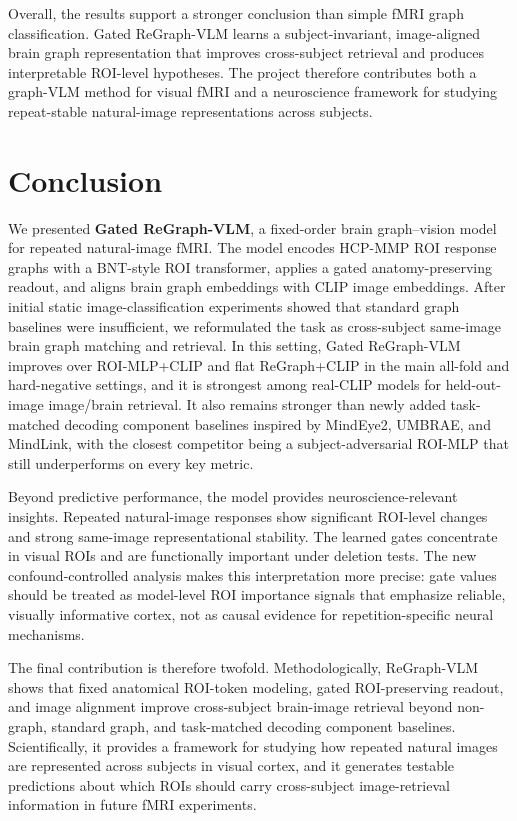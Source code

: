 \documentclass{article}
\begin{document}
Overall, the results support a stronger conclusion than simple fMRI graph classification. Gated ReGraph-VLM learns a subject-invariant, image-aligned brain graph representation that improves cross-subject retrieval and produces interpretable ROI-level hypotheses. The project therefore contributes both a graph-VLM method for visual fMRI and a neuroscience framework for studying repeat-stable natural-image representations across subjects.

\section{Conclusion}
\label{sec:conclusion}

We presented \textbf{Gated ReGraph-VLM}, a fixed-order brain graph--vision model for repeated natural-image fMRI. The model encodes HCP-MMP ROI response graphs with a BNT-style ROI transformer, applies a gated anatomy-preserving readout, and aligns brain graph embeddings with CLIP image embeddings. After initial static image-classification experiments showed that standard graph baselines were insufficient, we reformulated the task as cross-subject same-image brain graph matching and retrieval. In this setting, Gated ReGraph-VLM improves over ROI-MLP+CLIP and flat ReGraph+CLIP in the main all-fold and hard-negative settings, and it is strongest among real-CLIP models for held-out-image image/brain retrieval. It also remains stronger than newly added task-matched decoding component baselines inspired by MindEye2, UMBRAE, and MindLink, with the closest competitor being a subject-adversarial ROI-MLP that still underperforms on every key metric.

Beyond predictive performance, the model provides neuroscience-relevant insights. Repeated natural-image responses show significant ROI-level changes and strong same-image representational stability. The learned gates concentrate in visual ROIs and are functionally important under deletion tests. The new confound-controlled analysis makes this interpretation more precise: gate values should be treated as model-level ROI importance signals that emphasize reliable, visually informative cortex, not as causal evidence for repetition-specific neural mechanisms.

The final contribution is therefore twofold. Methodologically, ReGraph-VLM shows that fixed anatomical ROI-token modeling, gated ROI-preserving readout, and image alignment improve cross-subject brain-image retrieval beyond non-graph, standard graph, and task-matched decoding component baselines. Scientifically, it provides a framework for studying how repeated natural images are represented across subjects in visual cortex, and it generates testable predictions about which ROIs should carry cross-subject image-retrieval information in future fMRI experiments.
\end{document}
